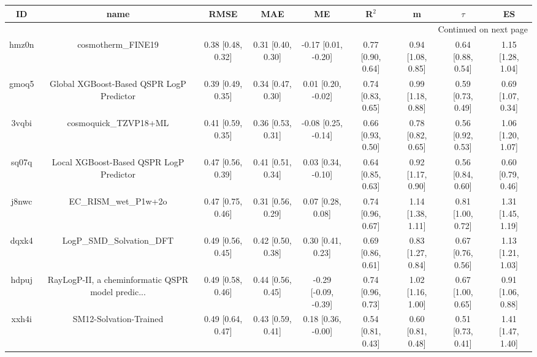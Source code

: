 \documentclass{article}
\begin{document}
\begin{center}
\scriptsize
\begin{longtable}{|ccccccccc|}
\toprule
    ID &                                               name &               RMSE &                MAE &                    ME &              R$^2$ &                     m &                $\tau$ &                    ES \\
\midrule
\endhead
\midrule
\multicolumn{9}{r}{{Continued on next page}} \\
\midrule
\endfoot

\bottomrule
\endlastfoot
 hmz0n &                                 cosmotherm\_FINE19 &  0.38 [0.48, 0.32] &  0.31 [0.40, 0.30] &   -0.17 [0.01, -0.20] &  0.77 [0.90, 0.64] &     0.94 [1.08, 0.85] &     0.64 [0.88, 0.54] &     1.15 [1.28, 1.04] \\
 gmoq5 &           Global XGBoost-Based QSPR LogP Predictor &  0.39 [0.49, 0.35] &  0.34 [0.47, 0.30] &    0.01 [0.20, -0.02] &  0.74 [0.83, 0.65] &     0.99 [1.18, 0.88] &     0.59 [0.73, 0.49] &     0.69 [1.07, 0.34] \\
 3vqbi &                              cosmoquick\_TZVP18+ML &  0.41 [0.59, 0.35] &  0.36 [0.53, 0.31] &   -0.08 [0.25, -0.14] &  0.66 [0.93, 0.50] &     0.78 [0.82, 0.65] &     0.56 [0.92, 0.53] &     1.06 [1.20, 1.07] \\
 sq07q &            Local XGBoost-Based QSPR LogP Predictor &  0.47 [0.56, 0.39] &  0.41 [0.51, 0.34] &    0.03 [0.34, -0.10] &  0.64 [0.85, 0.63] &     0.92 [1.17, 0.90] &     0.56 [0.84, 0.60] &     0.60 [0.79, 0.46] \\
 j8nwc &                              EC\_RISM\_wet\_P1w+2o &  0.47 [0.75, 0.46] &  0.31 [0.56, 0.29] &     0.07 [0.28, 0.08] &  0.74 [0.96, 0.67] &     1.14 [1.38, 1.11] &     0.81 [1.00, 0.72] &     1.31 [1.45, 1.19] \\
 dqxk4 &                          LogP\_SMD\_Solvation\_DFT &  0.49 [0.56, 0.45] &  0.42 [0.50, 0.38] &     0.30 [0.41, 0.23] &  0.69 [0.86, 0.61] &     0.83 [1.27, 0.84] &     0.67 [0.76, 0.56] &     1.13 [1.21, 1.03] \\
 hdpuj &  RayLogP-II, a cheminformatic QSPR model predic... &  0.49 [0.58, 0.46] &  0.44 [0.56, 0.45] &  -0.29 [-0.09, -0.39] &  0.74 [0.96, 0.73] &     1.02 [1.16, 1.00] &     0.67 [1.00, 0.65] &     0.91 [1.06, 0.88] \\
 xxh4i &                             SM12-Solvation-Trained &  0.49 [0.64, 0.47] &  0.43 [0.59, 0.41] &    0.18 [0.36, -0.00] &  0.54 [0.81, 0.43] &     0.60 [0.81, 0.48] &     0.51 [0.73, 0.41] &     1.41 [1.47, 1.40] \\

\end{longtable}
\end{center}
\end{document}
